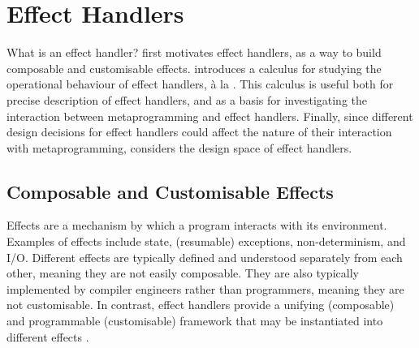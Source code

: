 \section{Effect Handlers}\label{section:effects-technical}
What is an effect handler?  first motivates effect handlers, as a way to build composable and customisable effects.  introduces a calculus for studying the operational behaviour of effect handlers, à la \citet{pretnar-15}. This calculus is useful both for precise description of effect handlers, and as a basis for investigating the interaction between metaprogramming and effect handlers. Finally, since different design decisions for effect handlers could affect the nature of their interaction with metaprogramming,  considers the design space of effect handlers.

\subsection{Composable and Customisable Effects}\label{subsection:effect-handler-motivation}
Effects are a mechanism by which a program interacts with its environment. Examples of effects include state, (resumable) exceptions, non-determinism, and I/O. Different effects are typically defined and understood separately from each other, meaning they are not easily composable. They are also typically implemented by compiler engineers rather than programmers, meaning they are not customisable. In contrast, effect handlers provide a unifying (composable) and programmable (customisable) framework that may be instantiated into different effects \citep{kiselyov-2012}.




